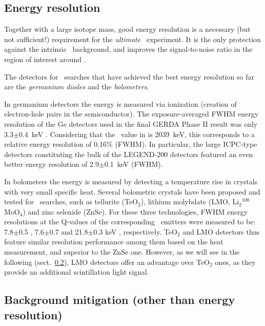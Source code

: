 
\subsection{Energy resolution} \label{subsec:energyresolution}
%
Together with a large isotope mass, good energy resolution is a necessary (but not sufficient!) requirement for the \emph{ultimate} \bbonu\ experiment. It is the only protection against the intrinsic \bbtnu\ background, and improves the signal-to-noise ratio in the region of interest around \Qbb. 

The detectors for \bb\ searches that have achieved the best energy resolution so far are the \emph{germanium diodes} and the \emph{bolometers}. 

In germanium detectors the energy is measured via ionization (creation of electron-hole pairs in the semiconductor). The exposure-averaged FWHM energy resolution of the Ge detectors used in the final GERDA Phase II result was only 3.3$\pm$0.4~keV \cite{GERDA:2020xhi}. Considering that the \Qbb\ value in  is 2039~keV, this corresponds to a relative energy resolution of 0.16\% (FWHM). In particular, the large ICPC-type detectors constituting the bulk of the LEGEND-200 detectors featured an even better energy resolution of 2.9$\pm$0.1~keV (FWHM). 

In bolometers the energy is measured by detecting a temperature rise in crystals with very small specific heat. Several bolometric crystals have been proposed and tested for \bb\ searches, such as tellurite (TeO$_{2}$), lithium molybdate (LMO, Li$_2$$^{100}$MoO$_4$) and zinc selenide (ZnSe). For these three technologies, FWHM energy resolutions at the Q-values of the corresponding \bb\ emitters were measured to be: 7.8$\pm$0.5 \cite{CUORE:2021mvw}, 7.6$\pm$0.7 \cite{CUPID:2020aow} and 21.8$\pm$0.3 keV \cite{CUPID:2022puj}, respectively. TeO$_{2}$ and LMO detectors thus feature similar resolution performance among them based on the heat measurement, and superior to the ZnSe one. However, as we will see in the following (sect.~\ref{subsec:bgr_mitigation}), LMO detectors offer an advantage over TeO$_{2}$ ones, as they provide an additional scintillation light signal.



 

\subsection{Background mitigation (other than energy resolution)} \label{subsec:bgr_mitigation}

